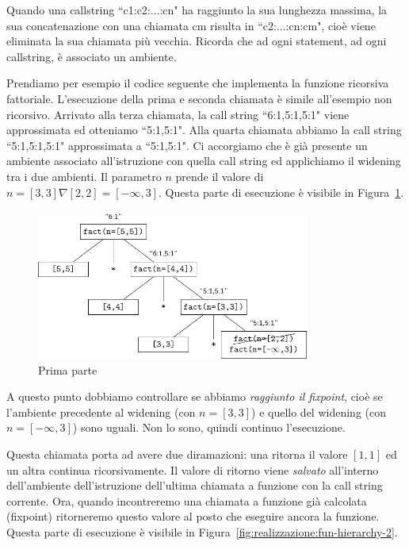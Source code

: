 Quando una callstring \textsf{``c1:c2:...:cn"} ha raggiunto la sua lunghezza massima, la sua concatenazione con una chiamata \textsf{cm} risulta in \textsf{``c2:...:cn:cm"}, cioè viene eliminata la sua chiamata più vecchia. Ricorda che ad ogni statement, ad ogni callstring, è associato un ambiente.

Prendiamo per esempio il codice seguente che implementa la funzione ricorsiva fattoriale. L'esecuzione della prima e seconda chiamata è simile all'esempio non ricorsivo. Arrivato alla terza chiamata, la call string \textsf{``6:1,5:1,5:1"} viene approssimata ed otteniamo \textsf{``5:1,5:1"}. Alla quarta chiamata abbiamo la call string \textsf{``5:1,5:1,5:1"} approssimata a \textsf{``5:1,5:1"}. Ci accorgiamo che è già presente un ambiente associato all'istruzione con quella call string ed applichiamo il widening tra i due ambienti. Il parametro $n$ prende il valore di $n = [3,3] \nabla [2,2] = [-\infty,3]$. Questa parte di esecuzione è visibile in Figura~\ref{fig:realizzazione:fun-hierarchy-1}.

\begin{figure}[htbp]
    \centering
    \includegraphics[width=0.8\textwidth]{scheme-generator/generated/example-fun-rec-hierarchy-1.pdf}
    \caption{Prima parte}
    \label{fig:realizzazione:fun-hierarchy-1}
\end{figure}

A questo punto dobbiamo controllare se abbiamo \emph{raggiunto il fixpoint}, cioè se l'ambiente precedente al widening (con $n=[3,3]$) e quello del widening (con $n = [-\infty, 3]$) sono uguali. Non lo sono, quindi continuo l'esecuzione.

Questa chiamata porta ad avere due diramazioni: una ritorna il valore $[1,1]$ ed un altra continua ricorsivamente. Il valore di ritorno viene \emph{salvato} all'interno dell'ambiente dell'istruzione dell'ultima chiamata a funzione con la call string corrente. Ora, quando incontreremo una chiamata a funzione già calcolata (fixpoint) ritorneremo questo valore al posto che eseguire ancora la funzione. Questa parte di esecuzione è visibile in Figura~\ref{fig:realizzazione:fun-hierarchy-2}.


